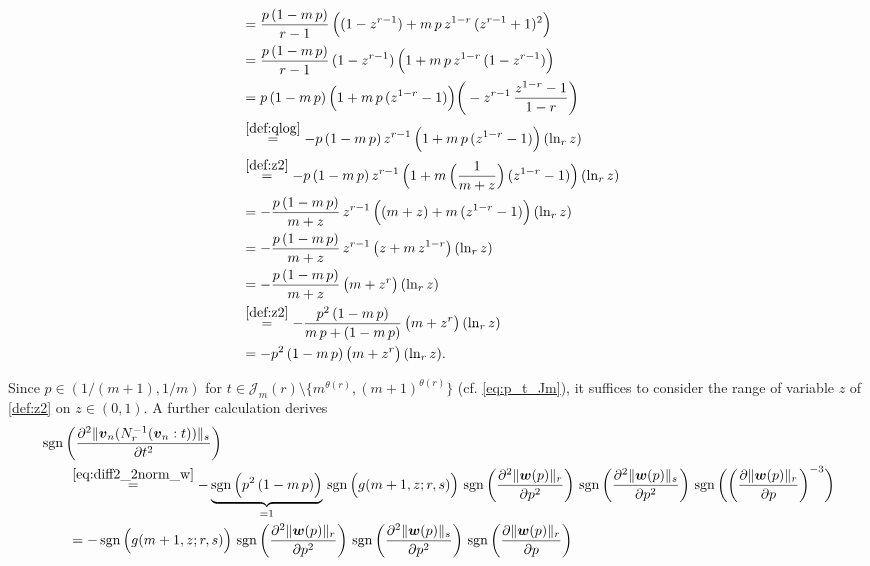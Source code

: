 \documentclass[conference, draftcls, onecolumn]{IEEEtran}
\theoremstyle{plain}
\newcommand{\bvec}[1]{\boldsymbol{#1}}
\newcommand{\sgn}{\operatorname{sgn}}
\newcommand{\lemref}[1]{Lemma~\ref{#1}}
\begin{document}
\begin{IEEEproof}[Proof of \lemref{lem:convex_w}]
\begin{itemize}
\begin{align}
\\
& =
\frac{ p \, (1 - m \, p) }{ r - 1 } \, \Big( (1 - z^{r-1}) + m \, p \, z^{1-r} \, (z^{r-1} + 1)^{2} \Big)
\\
& =
\frac{ p \, (1 - m \, p) }{ r - 1 } \, (1 - z^{r-1}) \, \Big( 1 + m \, p \, z^{1-r} \, (1 - z^{r-1}) \Big)
\\
& =
p \, (1 - m \, p) \, \Big( 1 + m \, p \, (z^{1-r} - 1) \Big) \bigg( - z^{r-1} \, \frac{ z^{1-r} - 1 }{ 1 - r } \bigg)
\\
& \overset{\eqref{def:qlog}}{=}
- p \, (1 - m \, p) \, z^{r-1} \, \Big( 1 + m \, p \, (z^{1-r} - 1) \Big) \, (\ln_{r} z)
\\
& \overset{\eqref{def:z2}}{=}
- p \, (1 - m \, p) \, z^{r-1} \, \Big( 1 + m \, \Big( \frac{ 1 }{ m + z } \Big) \, (z^{1-r} - 1) \Big) \, (\ln_{r} z)
\\
& =
- \frac{ p \, (1 - m \, p) }{ m + z } \, z^{r-1} \, \Big( (m+z) + m \, (z^{1-r} - 1) \Big) \, (\ln_{r} z)
\\
& =
- \frac{ p \, (1 - m \, p) }{ m + z } \, z^{r-1} \, \big( z + m \, z^{1-r} \big) \, (\ln_{r} z)
\\
& =
- \frac{ p \, (1 - m \, p) }{ m + z } \, \big( m + z^{r} \big) \, (\ln_{r} z)
\\
& \overset{\eqref{def:z2}}{=}
- \frac{ p^{2} \, (1 - m \, p) }{ m \, p + (1 - m \, p) } \, \big( m + z^{r} \big) \, (\ln_{r} z)
\\
& =
- p^{2} \, (1 - m \, p) \, \big( m + z^{r} \big) \, (\ln_{r} z) .
\end{align}
\end{itemize}
Since $p \in (1/(m+1), 1/m)$ for $t \in \mathcal{J}_{m}( r ) \setminus \{ m^{\theta( r )}, (m+1)^{\theta( r )} \}$ (cf. \eqref{eq:p_t_Jm}), it suffices to consider the range of variable $z$ of \eqref{def:z2} on $z \in (0, 1)$.
A further calculation derives
\begin{align}
&
\sgn \bigg( \frac{ \partial^{2} \| \bvec{v}_{n}( N_{r}^{-1}( \bvec{v}_{n} : t ) ) \|_{s} }{ \partial t^{2} } \bigg)
\notag \\
& \qquad \overset{\eqref{eq:diff2_2norm_w}}{=}
- \underbrace{ \sgn\Big( p^{2} \, (1 - m \, p) \Big) }_{ = 1 } \, \sgn\Big( g(m+1, z; r, s) \Big) \, \sgn\bigg( \frac{ \partial^{2} \| \bvec{w}( p ) \|_{r} }{ \partial p^{2} } \bigg) \, \sgn\bigg( \frac{ \partial^{2} \| \bvec{w}( p ) \|_{s} }{ \partial p^{2} } \bigg) \, \sgn\bigg( \bigg( \frac{ \partial \| \bvec{w}( p ) \|_{r} }{ \partial p } \bigg)^{-3} \bigg)
\\
& \qquad =
- \sgn\Big( g(m+1, z; r, s) \Big) \, \sgn\bigg( \frac{ \partial^{2} \| \bvec{w}( p ) \|_{r} }{ \partial p^{2} } \bigg) \, \sgn\bigg( \frac{ \partial^{2} \| \bvec{w}( p ) \|_{s} }{ \partial p^{2} } \bigg) \, \sgn\bigg( \frac{ \partial \| \bvec{w}( p ) \|_{r} }{ \partial p } \bigg)

\end{align}
\end{IEEEproof}
\end{document}
